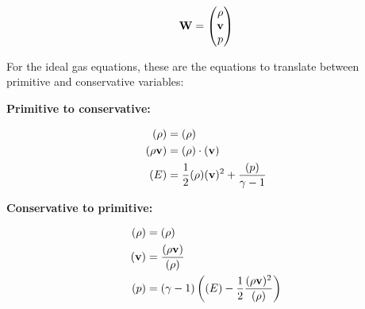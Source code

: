 \begin{align}
	\mathbf{W} = 
		\begin{pmatrix}
			\rho \\ \mathbf{v} \\ p
		\end{pmatrix}
\end{align}



For the ideal gas equations, these are the equations to translate between
primitive and conservative variables:

\textbf{Primitive to conservative:}

\begin{align}
	(\rho) &= (\rho) \\
	(\rho \mathbf{v}) &= (\rho) \cdot (\mathbf{v}) \\
	(E) &= \frac{1}{2} (\rho) (\mathbf{v})^2 + \frac{(p)}{\gamma - 1} 
\end{align}


\textbf{Conservative to primitive:}

\begin{align}
	(\rho) &= (\rho) \\
	(\mathbf{v}) &= \frac{(\rho \mathbf{v} )}{(\rho)}\\
	(p) &= (\gamma - 1)  \left((E) - \frac{1}{2} \frac{(\rho \mathbf{v})^2}{(\rho)} \right) 
\end{align}



